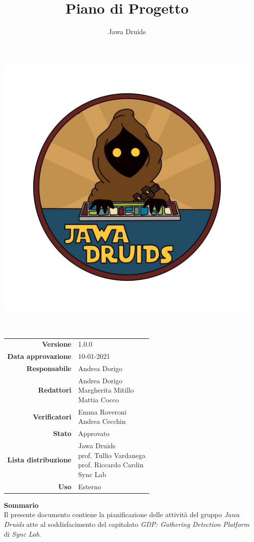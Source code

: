 




\makeatletter
\begin{titlepage}
	\begin{center}
		\vspace*{-5cm}
		\author{Jawa Druids}
		\title{Piano di Progetto}
		\date{} %
		\includegraphics[width=0.5\linewidth]{../immagini/DRUIDSLOGO.jpg}\\[4ex]
		{\huge \bfseries  \@title }\\[2ex]
		{\LARGE  \@author}\\[50ex]
		\vspace*{-9cm}
		\begin{table}[H]
			\renewcommand{\arraystretch}{1.4}
			\centering
			\begin{tabular}{r | l}
				\textbf{Versione} & 1.0.0 \\%
				\textbf{Data approvazione} & 10-01-2021\\
				\textbf{Responsabile} & Andrea Dorigo\\
				\textbf{Redattori} & \makecell[tl]{Andrea Dorigo \\ Margherita Mitillo \\ Mattia Cocco} \\
				\textbf{Verificatori} & \makecell[tl]{Emma Roveroni \\ Andrea Cecchin} \\
				\textbf{Stato} & Approvato\\
				\textbf{Lista distribuzione} & \makecell[tl]{Jawa Druids \\ prof. Tullio Vardanega \\ prof. Riccardo Cardin \\ Sync Lab}\\
				\textbf{Uso} & Esterno
			\end{tabular}
		\end{table}
		\vspace{0.1cm}
		\hfill \break
		\fontsize{17}{10}\textbf{Sommario} \\
		\vspace{0.1cm}
    Il presente documento contiene la pianificazione delle attività del gruppo  \normalsize\textit{Jawa Druids} atte al soddisfacimento del capitolato \normalsize\textit{GDP: Gathering Detection Platform} di  \normalsize\textit{Sync Lab}.
	\end{center}
\end{titlepage}
